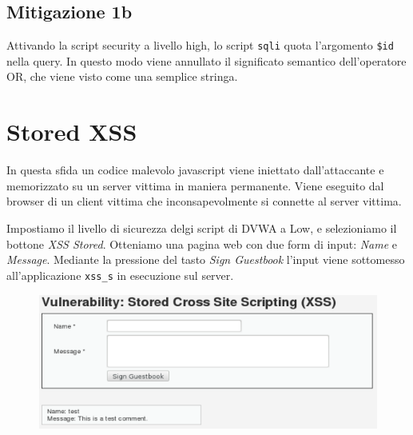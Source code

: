 \subsection{Mitigazione 1b}
Attivando la script security a livello high, lo script \texttt{sqli} quota l'argomento \texttt{\$id} nella query. In questo modo viene annullato il significato semantico dell'operatore OR, che viene visto come una semplice stringa.


\section{Stored XSS}
In questa sfida un codice malevolo javascript viene iniettato dall'attaccante e memorizzato su un server vittima in maniera permanente. Viene eseguito dal browser di un client vittima che inconsapevolmente si connette al server vittima. 

Impostiamo il livello di sicurezza delgi script di DVWA a Low, e selezioniamo il bottone \textit{XSS Stored}. Otteniamo una pagina web con due form di input: \textit{Name} e \textit{Message}. Mediante la pressione del tasto \textit{Sign Guestbook} l'input viene sottomesso all'applicazione \texttt{xss\_s} in esecuzione sul server.

\begin{figure}[hbpt!]
    \centering
    \includegraphics[width= 0.7 \textwidth]{./Images/cap6/6.6.png}
\end{figure}
\FloatBarrier

